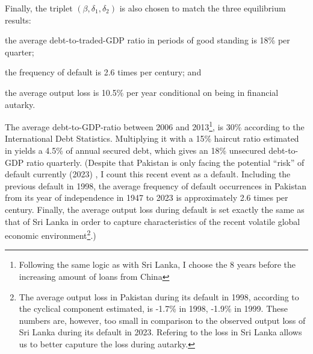 Finally, the triplet $\left( \beta, \delta_1, \delta_2 \right)$ is also chosen to match the three equilibrium results:
\begin{enumerate*}[label = (\roman*)]
    \item the average debt-to-traded-GDP ratio in periods of good standing is 18\% per quarter;
    \item the frequency of default is 2.6 times per century; and
    \item the average output loss is 10.5\% per year conditional on being in financial autarky.
\end{enumerate*}
The average debt-to-GDP-ratio between 2006 and 2013\footnote{Following the same logic as with Sri Lanka, I choose the 8 years before the increasing amount of loans from China}, is 30\% according to the International Debt Statistics. Multiplying it with a 15\% haircut ratio estimated in \citet{Cruces-Trebesch-13} yields a 4.5\% of annual secured debt, which gives an 18\% unsecured debt-to-GDP ratio quarterly.
(Despite that Pakistan is only facing the potential ``risk'' of default currently (2023)\footnotemark{}
, I count this recent event as a default.
Including the previous default in 1998, the average frequency of default occurrences in Pakistan from its year of independence in 1947 to 2023 is approximately 2.6 times per century\footnotemark{}.
Finally, the average output loss during default is set exactly the same as that of Sri Lanka in order to capture characteristics of the recent volatile global economic environment\footnote{The average output loss in Pakistan during its default in 1998, according to the cyclical component estimated, is -1.7\% in 1998, -1.9\% in 1999. These numbers are, however, too small in comparison to the observed output loss of Sri Lanka during its default in 2023. Refering to the loss in Sri Lanka allows us to better caputure the loss during autarky.}.)
